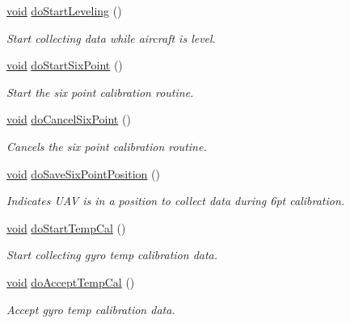 \begin{DoxyCompactItemize}
\item 
\hyperlink{group___u_a_v_objects_plugin_ga444cf2ff3f0ecbe028adce838d373f5c}{void} \hyperlink{class_calibration_a74c9adf432cfde3c607dc3459c9ff5b1}{do\-Start\-Leveling} ()
\begin{DoxyCompactList}\small\item\em \-Start collecting data while aircraft is level. \end{DoxyCompactList}\item 
\hyperlink{group___u_a_v_objects_plugin_ga444cf2ff3f0ecbe028adce838d373f5c}{void} \hyperlink{class_calibration_a5bea779241f9d9bb50e2c670ea588a43}{do\-Start\-Six\-Point} ()
\begin{DoxyCompactList}\small\item\em \-Start the six point calibration routine. \end{DoxyCompactList}\item 
\hyperlink{group___u_a_v_objects_plugin_ga444cf2ff3f0ecbe028adce838d373f5c}{void} \hyperlink{class_calibration_a5a9bae0780189e6dfd1aadaa825232e0}{do\-Cancel\-Six\-Point} ()
\begin{DoxyCompactList}\small\item\em \-Cancels the six point calibration routine. \end{DoxyCompactList}\item 
\hyperlink{group___u_a_v_objects_plugin_ga444cf2ff3f0ecbe028adce838d373f5c}{void} \hyperlink{class_calibration_a0d28935bfd66742e8551ddbdd98ce941}{do\-Save\-Six\-Point\-Position} ()
\begin{DoxyCompactList}\small\item\em \-Indicates \-U\-A\-V is in a position to collect data during 6pt calibration. \end{DoxyCompactList}\item 
\hyperlink{group___u_a_v_objects_plugin_ga444cf2ff3f0ecbe028adce838d373f5c}{void} \hyperlink{class_calibration_ad79bd9545005476bb15c478607e55a36}{do\-Start\-Temp\-Cal} ()
\begin{DoxyCompactList}\small\item\em \-Start collecting gyro temp calibration data. \end{DoxyCompactList}\item 
\hyperlink{group___u_a_v_objects_plugin_ga444cf2ff3f0ecbe028adce838d373f5c}{void} \hyperlink{class_calibration_a410796ba6e560144c62ec42a8b7bc9b9}{do\-Accept\-Temp\-Cal} ()
\begin{DoxyCompactList}\small\item\em \-Accept gyro temp calibration data. \end{DoxyCompactList}\item 

\end{DoxyCompactItemize}
